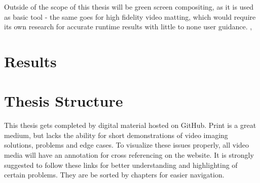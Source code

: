 Outside of the scope of this thesis will be green screen compositing, as it is 
used as basic tool - the same goes for high fidelity video matting, which would 
require its own research for accurate runtime results with little to none user 
guidance. 
\cite{gong:realtime-matting:2010}, \cite{gastal:shared-sampling:2010}

\section{Results}
\label{sec:intro:results}


\section{Thesis Structure}
\label{sec:intro:structure}

This thesis gets completed by digital material hosted on GitHub. Print is a 
great medium, but lacks the ability for short demonstrations of video imaging 
solutions, problems and edge cases. To visualize these issues properly, all 
video media will have an annotation for cross referencing on the website. It is 
strongly suggested to follow these links for better understanding and 
highlighting of certain problems. They are be sorted by chapters for easier 
navigation.